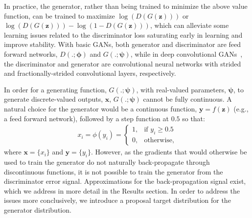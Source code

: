 \documentclass[10pt]{article}
\newcommand{\vect}[1]{\mathbf{#1}}
\newcommand{\vects}[1]{\boldsymbol{#1}}
\newcommand{\vx}[0]{\vect{x}}
\newcommand{\vz}[0]{\vect{z}}
\newcommand{\vy}[0]{\vect{y}}
\newcommand{\PP}[0]{\vects{\phi}}
\newcommand{\PS}[0]{\vects{\psi}}
\begin{document}
In practice, the generator, rather than being trained to minimize the above value function, can be trained to maximize $\log(D(G(\vz)))$ or $\log(D(G(\vz))) - \log(1 - D(G(\vz)))$, which can alleviate some learning issues related to the discriminator loss saturating early in learning and improve stability.
With basic GANs, both generator and discriminator are feed forward networks, $D(.; \PP)$ and $G(.; \PS)$, while in deep convolutional GANs~\citep[DCGAN,][]{radford2015unsupervised}, the discriminator and generator are convolutional neural networks with strided and fractionally-strided convolutional layers, respectively.

In order for a generating function, $G(.;\PS)$, with real-valued parameters, $\PS$, to generate discrete-valued outputs, $\vx$, $G(.;\PS)$ cannot be fully continuous.
A natural choice for the generator would be a continuous function, $\vy = f(\vz)$ (e.g., a feed forward network), followed by a step function at $0.5$ so that:
\begin{align}
x_i = \phi(y_i) = 
\begin{cases}
    1,& \text{if } y_i \geq 0.5\\
    0,              & \text{otherwise},
\end{cases}
\end{align}
where $\vx = \{x_i\}$ and $\vy = \{y_i\}$.
However, as the gradients that would otherwise be used to train the generator do not naturally back-propagate through discontinuous functions, it is not possible to train the generator from the discriminator error signal.
Approximations for the back-propagation signal exist, which we address in more detail in the Results section.
In order to address the issues more conclusively, we introduce a proposal target distribution for the generator distribution.
\end{document}
